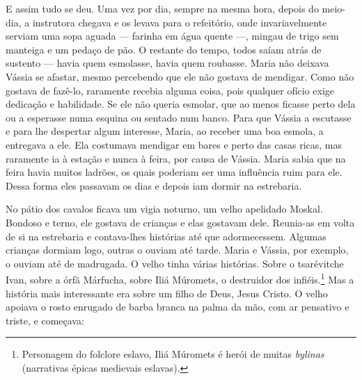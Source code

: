 E assim tudo se deu. Uma vez por dia, sempre na mesma hora, depois do
meio-dia, a instrutora chegava e os levava para o refeitório, onde
invariavelmente serviam uma sopa aguada --- farinha em água quente ---,
mingau de trigo sem manteiga e um pedaço de pão. O restante do tempo,
todos saíam atrás de sustento --- havia quem esmolasse, havia quem
roubasse. Maria não deixava Vássia se afastar, mesmo percebendo que ele
não gostava de mendigar. Como não gostava de fazê-lo, raramente recebia
alguma coisa, pois qualquer ofício exige dedicação e habilidade. Se ele
não queria esmolar, que ao menos ficasse perto dela ou a esperasse numa
esquina ou sentado num banco. Para que Vássia a escutasse e para lhe
despertar algum interesse, Maria, ao receber uma boa esmola, a entregava
a ele. Ela costumava mendigar em bares e perto das casas ricas, mas
raramente ia à estação e nunca à feira, por causa de Vássia. Maria sabia
que na feira havia muitos ladrões, os quais poderiam ser uma influência
ruim para ele. Dessa forma eles passavam os dias e depois iam dormir na
estrebaria.

No pátio dos cavalos ficava um vigia noturno, um velho apelidado Moskal.
Bondoso e terno, ele gostava de crianças e elas gostavam dele. Reunia-as
em volta de si na estrebaria e contava-lhes histórias até que
adormecessem. Algumas crianças dormiam logo, outras o ouviam até tarde.
Maria e Vássia, por exemplo, o ouviam até de madrugada. O velho tinha
várias histórias. Sobre o tsarévitche Ivan, sobre a órfã Márfucha, sobre
Iliá Múromets, o destruidor dos infiéis.\footnote{Personagem do folclore
  eslavo, Iliá Múromets é herói de muitas \emph{bylinas} (narrativas
  épicas medievais eslavas).} Mas a história mais interessante era sobre
um filho de Deus, Jesus Cristo. O velho apoiava o rosto enrugado de
barba branca na palma da mão, com ar pensativo e triste, e começava:

